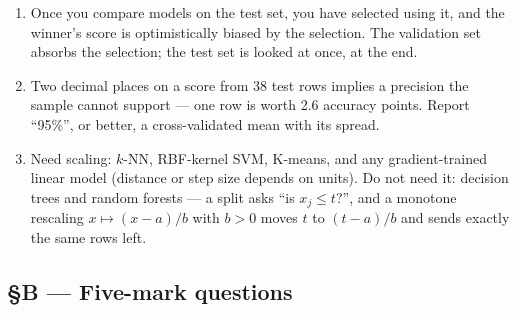 \documentclass[11pt,a4paper]{article}
\newcommand{\A}[1]{\item[\textbf{#1}]}
\begin{document}
\begin{enumerate}[leftmargin=1.9cm]
\A{U1.11} Once you compare models on the test set, you have selected using it,
and the winner's score is optimistically biased by the selection. The
validation set absorbs the selection; the test set is looked at once, at the
end.

\A{U1.12} Two decimal places on a score from 38 test rows implies a precision
the sample cannot support --- one row is worth 2.6 accuracy points. Report
``95\%'', or better, a cross-validated mean with its spread.

\A{U1.13} Need scaling: $k$-NN, RBF-kernel SVM, K-means, and any
gradient-trained linear model (distance or step size depends on units). Do not
need it: decision trees and random forests --- a split asks
``is $x_j \le t$?'', and a monotone rescaling $x \mapsto (x-a)/b$ with $b>0$
moves $t$ to $(t-a)/b$ and sends exactly the same rows left.

\end{enumerate}

\subsection*{§B --- Five-mark questions}
\end{document}
